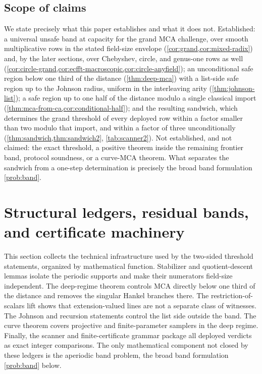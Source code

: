 \documentclass[11pt]{article}
\theoremstyle{definition}
\theoremstyle{remark}
\begin{document}
\subsection{Scope of claims}

We state precisely what this paper establishes and what it does not. Established: a universal unsafe band at capacity for the grand MCA challenge, over smooth multiplicative rows in the stated field-size envelope (\cref{cor:grand,cor:mixed-radix}) and, by the later sections, over Chebyshev, circle, and genus-one rows as well (\cref{cor:circle-grand,cor:ecfft-macroscopic,cor:circle-anyfield}); an unconditional safe region below one third of the distance (\cref{thm:deep-mca}) with a list-side safe region up to the Johnson radius, uniform in the interleaving arity (\cref{thm:johnson-list}); a safe region up to one half of the distance modulo a single classical import (\cref{thm:mca-from-ca,cor:conditional-half}); and the resulting sandwich, which determines the grand threshold of every deployed row within a factor smaller than two modulo that import, and within a factor of three unconditionally (\cref{thm:sandwich,thm:sandwich2}, \cref{tab:scanner2}). Not established, and not claimed: the exact threshold, a positive theorem inside the remaining frontier band, protocol soundness, or a curve-MCA theorem. What separates the sandwich from a one-step determination is precisely the broad band formulation \cref{prob:band}.

\section{Structural ledgers, residual bands, and certificate machinery}\label{sec:discharge}

This section collects the technical infrastructure used by the two-sided threshold statements, organized by mathematical function.  Stabilizer and quotient-descent lemmas isolate the periodic supports and make their numerators field-size independent.  The deep-regime theorem controls MCA directly below one third of the distance and removes the singular Hankel branches there.  The restriction-of-scalars lift shows that extension-valued lines are not a separate class of witnesses.  The Johnson and recursion statements control the list side outside the band.  The curve theorem covers projective and finite-parameter samplers in the deep regime.  Finally, the scanner and finite-certificate grammar package all deployed verdicts as exact integer comparisons.  The only mathematical component not closed by these ledgers is the aperiodic band problem, the broad band formulation \cref{prob:band} below.
\end{document}

